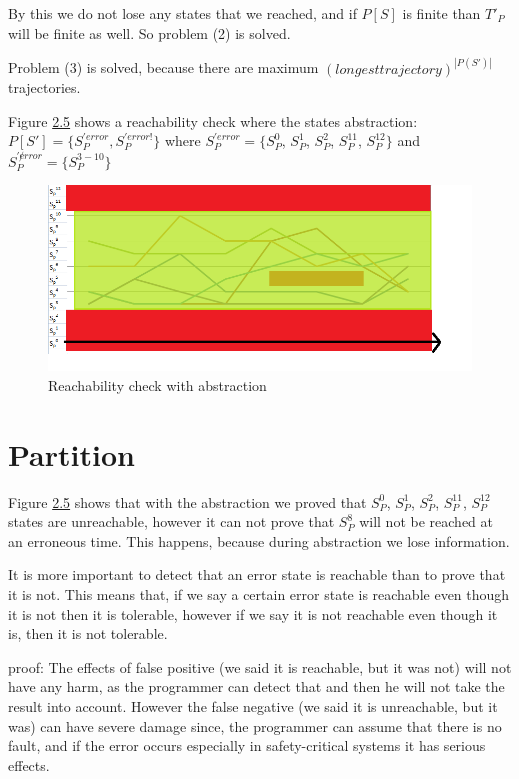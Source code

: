 By this we do not lose any states that we reached, and if $P[S]$ is finite than $T'_{P}$ will be finite as well. So problem (2) is solved.

Problem (3) is solved, because there are maximum $(longest trajectory)^{|P(S')|}$ trajectories.

Figure \hyperref[fig:trajectory7]{2.5} shows a reachability check where the states abstraction: $P[S']=\{S_{P}^{'error}, S_{P}^{'error!}\}$ where $S_{P}^{'error}=\{S_{P}^{0}$, $S_{P}^{1}$, $S_{P}^{2}$, $S_{P}^{11}$, $S_{P}^{12}\}$ and $S_{P}^{'\not error}=\{S_{P}^{3-10}\}$

 \begin{figure} [!ht]
 	\centering
 	\includegraphics[width=150mm, keepaspectratio]{figures/trajectory7.png}
 	\caption{\label{fig:trajectory7}Reachability check with abstraction}
 \end{figure}


\section{Partition}
\label{sec:partition}

Figure \hyperref[fig:trajectory7]{2.5} shows that with the abstraction we proved that $S_{P}^{0}$, $S_{P}^{1}$, $S_{P}^{2}$, $S_{P}^{11}$, $S_{P}^{12}$ states are unreachable, however it can not prove that $S_{P}^{8}$ will not be reached at an erroneous
time. This happens, because during abstraction we lose information.

\begin{theorem}
	It is more important to detect that an error state is reachable than to prove that it is not. This means that, if we say a certain error state is reachable even though it is not then it is tolerable, however if we say it is not reachable even though it is, then it is not tolerable. 	
\end{theorem}
{proof: } The effects of false positive (we said it is reachable, but it was not) will not have any harm, as the programmer can detect that and then he will not take the result into account. However the false negative (we said it is unreachable, but it was) can have severe damage since, the programmer can assume that there is no fault, and if the error occurs especially in safety-critical systems it has serious effects.

